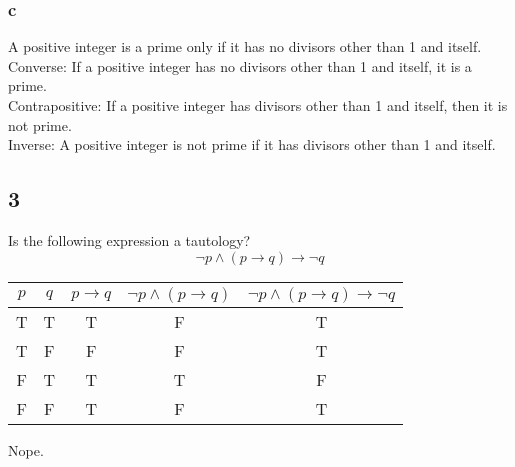 \documentclass[letterpaper, 12pt]{math}
\begin{document}
\subsubsection*{c}
A positive integer is a prime only if it has no divisors other than 1 and
itself. \\
Converse: If a positive integer has no divisors other than 1 and itself, it is
a prime. \\
Contrapositive: If a positive integer has divisors other than 1 and itself,
then it is not prime. \\
Inverse: A positive integer is not prime if it has divisors other than 1 and
itself.

\subsection*{3}
Is the following expression a tautology?
\[ \neg{p} \wedge (p \to q) \to \neg{q} \]
\begin{center}
  \begin{tabular}{|c|c|c|c|c|}
    \hline
    \( p \) & \( q \) & \( p \to q \) & \( \neg{p} \wedge (p \to q) \) &
    \( \neg{p} \wedge (p \to q) \to \neg{q} \) \\ \hline
    T & T & T & F & T \\ \hline
    T & F & F & F & T \\ \hline
    F & T & T & T & F \\ \hline
    F & F & T & F & T \\ \hline
  \end{tabular}
\end{center}
Nope.
\end{document}
